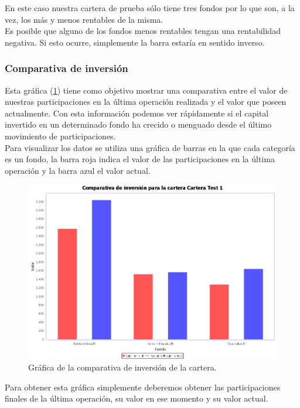 \documentclass[12pt, a4paper]{book}
\begin{document}
En este caso nuestra cartera de prueba sólo tiene tres fondos por lo que son, a la vez, los más y menos rentables de la misma.\\

Es posible que alguno de los fondos menos rentables tengan una rentabilidad negativa. Si esto ocurre, simplemente la barra estaría en sentido inverso.
	
\newpage
\subsubsection{Comparativa de inversión}

Esta gráfica (\ref{fig:comparativa}) tiene como objetivo mostrar una comparativa entre el valor de nuestras participaciones en la última operación realizada y el valor que poseen actualmente. Con esta información podemos ver rápidamente si el capital invertido en un determinado fondo ha crecido o menguado desde el último movimiento de participaciones.\\

Para visualizar los datos se utiliza una gráfica de barras en la que cada categoría es un fondo, la barra roja indica el valor de las participaciones en la última operación y la barra azul el valor actual.

	\begin{figure}[htbp]
	\centering
	\includegraphics[width=\textwidth]{figuras/comparativa.PNG}
	\caption{Gráfica de la comparativa de inversión de la cartera.}
	\label{fig:comparativa}
	\end {figure}

Para obtener esta gráfica simplemente deberemos obtener las participaciones finales de la última operación, su valor en ese momento y su valor actual.\\ 
\end{document}
